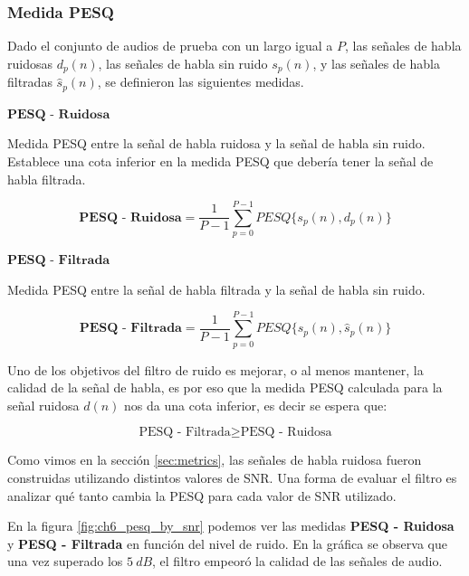 \subsubsection{Medida PESQ}

Dado el conjunto de audios de prueba con un largo igual a $P$, las señales de habla ruidosas $d_p(n)$, las señales de habla sin ruido $s_p(n)$, y las señales de habla filtradas $\hat{s}_p(n)$, se definieron las siguientes medidas.

\vspace{5mm}

\noindent $\textbf{PESQ - Ruidosa}$

\vspace{5mm}

Medida PESQ entre la señal de habla ruidosa y la señal de habla sin ruido. Establece una cota inferior en la medida PESQ que debería tener la señal de habla filtrada.

\begin{equation*}
	\textbf{PESQ - Ruidosa} = \frac{1}{P-1} \sum_{p=0}^{P-1} PESQ\{ s_p(n), d_p(n) \}
\end{equation*}

\noindent $\textbf{PESQ - Filtrada}$ 

\vspace{5mm}

Medida PESQ entre la señal de habla filtrada y la señal de habla sin ruido. 

\begin{equation*}
	\textbf{PESQ - Filtrada} = \frac{1}{P-1} \sum_{p=0}^{P-1} PESQ\{ s_p(n), \hat{s}_p(n) \}
\end{equation*}

Uno de los objetivos del filtro de ruido es mejorar, o al menos mantener, la calidad de la señal de habla, es por eso que la medida PESQ calculada para la señal ruidosa $d(n)$ nos da una cota inferior, es decir se espera que:

\begin{equation*}
	\text{PESQ - Filtrada} \geq \text{PESQ - Ruidosa}
\end{equation*}

Como vimos en la sección \ref{sec:metrics}, las señales de habla ruidosa fueron construidas utilizando distintos valores de SNR. Una forma de evaluar el filtro es analizar qué tanto cambia la PESQ para cada valor de SNR utilizado.

En la figura \ref{fig:ch6_pesq_by_snr} podemos ver las medidas \textbf{PESQ - Ruidosa} y \textbf{PESQ - Filtrada} en función del nivel de ruido. En la gráfica se observa que una vez superado los $\SI{5}{dB}$, el filtro empeoró la calidad de las señales de audio.

